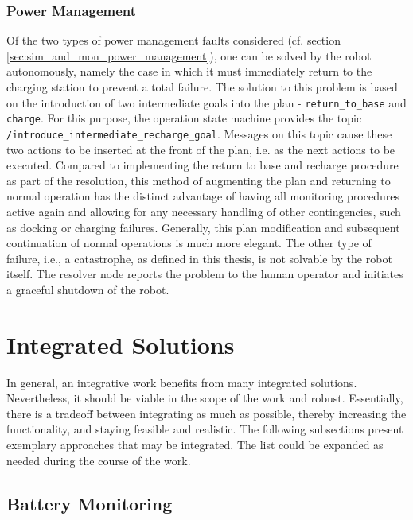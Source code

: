 \documentclass[english, master, utf8]{base/thesis_KBS}
\newcommand{\code}[1]{\colorbox{light-gray}{\texttt{#1}}}
\begin{document}
\subsection{Power Management}
\label{sec:power_management_resolver}

Of the two types of power management faults considered (cf. section \ref{sec:sim_and_mon_power_management}), one can be solved by the robot autonomously, namely the case in which it
must immediately return to the charging station to prevent a total failure. The solution to this problem is based on the introduction of two intermediate goals into the plan
- \code{return\_to\_base} and \code{charge}. For this purpose, the operation state machine provides the topic \code{/introduce\_intermediate\_recharge\_goal}. Messages on this topic
cause these two actions to be inserted at the front of the plan, i.e. as the next actions to be executed. Compared to implementing the return to base and recharge procedure as part of
the resolution, this method of augmenting the plan and returning to normal operation has the distinct advantage of having all monitoring procedures active again and allowing for any
necessary handling of other contingencies, such as docking or charging failures. Generally, this plan modification and subsequent continuation of normal operations is much more elegant.
The other type of failure, i.e., a catastrophe, as defined in this thesis, is not solvable by the robot itself. The resolver node reports the problem to the human operator and
initiates a graceful shutdown of the robot.

\chapter{Integrated Solutions}

In general, an integrative work benefits from many integrated solutions. Nevertheless, it should be viable in the scope of the work and robust.
Essentially, there is a tradeoff between integrating as much as possible, thereby increasing the functionality, and staying feasible and realistic.
The following subsections present exemplary approaches that may be integrated. The list could be expanded as needed during the course of the work.

\section{Battery Monitoring}
\label{sec:battery_monitoring}
\end{document}
